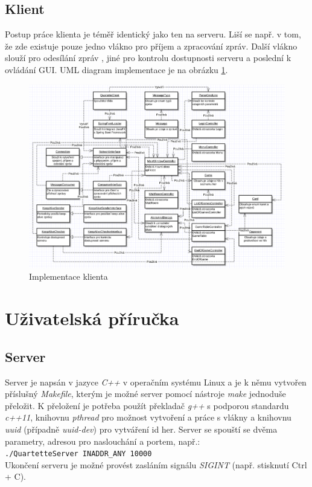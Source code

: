 \documentclass[12pt, a4paper]{article}
\begin{document}
		\subsection{Klient}
		Postup práce klienta je téměř identický jako ten na serveru. Liší se např. v tom, že zde existuje pouze jedno vlákno pro příjem a zpracování zpráv. Další vlákno slouží pro odesílání zpráv , jiné pro kontrolu dostupnosti serveru a poslední k ovládání GUI. UML diagram implementace je na obrázku \ref{Client}.
		\begin{figure}[ht!]
			\centering
			\caption{Implementace klienta}
			\label{Client}
			\includegraphics[width=13cm]{img/Client.png}
		\end{figure}
		
	\section{Uživatelská příručka}
		\subsection{Server}
		Server je napsán v jazyce \emph{C++} v operačním systému Linux a je k němu vytvořen příslušný \emph{Makefile}, kterým je možné server pomocí nástroje \emph{make} jednoduše přeložit. K přeložení je potřeba použít překladač \emph{g++} s podporou standardu \emph{c++11}, knihovnu \emph{pthread} pro možnost vytvoření a práce s vlákny a knihovnu \emph{uuid} (případně \emph{uuid-dev}) pro vytváření id her. Server se spouští se dvěma parametry, adresou pro naslouchání a portem, např.:\\
		\texttt{./QuartetteServer INADDR\_ANY 10000}\\
		Ukončení serveru je možné provést zasláním signálu \emph{SIGINT} (např. stisknutí Ctrl + C).
	
\end{document}
